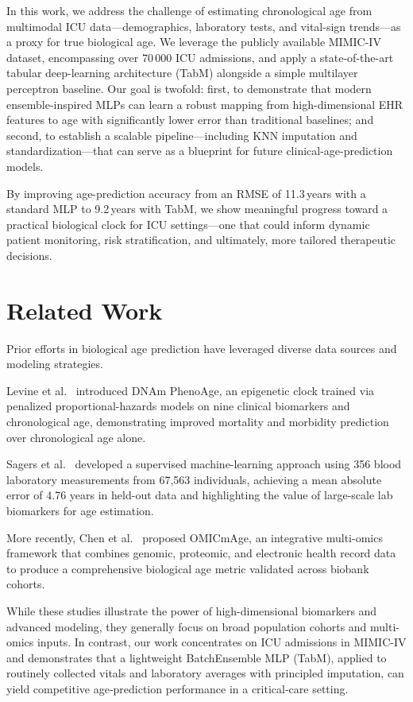 \documentclass[manuscript,screen,review]{acmart}
\begin{document}
In this work, we address the challenge of estimating chronological age from multimodal ICU data—demographics, laboratory tests, and vital-sign trends—as a proxy for true biological age. We leverage the publicly available MIMIC-IV dataset, encompassing over 70\,000 ICU admissions, and apply a state-of-the-art tabular deep-learning architecture (TabM) alongside a simple multilayer perceptron baseline. Our goal is twofold: first, to demonstrate that modern ensemble-inspired MLPs can learn a robust mapping from high-dimensional EHR features to age with significantly lower error than traditional baselines; and second, to establish a scalable pipeline—including KNN imputation and standardization—that can serve as a blueprint for future clinical-age-prediction models.

By improving age-prediction accuracy from an RMSE of 11.3\,years with a standard MLP to 9.2\,years with TabM, we show meaningful progress toward a practical biological clock for ICU settings—one that could inform dynamic patient monitoring, risk stratification, and ultimately, more tailored therapeutic decisions.

\section{Related Work}

Prior efforts in biological age prediction have leveraged diverse data sources and modeling strategies.

Levine et al.~\cite{levine2018epigenetic} introduced DNAm PhenoAge, an epigenetic clock trained via penalized proportional-hazards models on nine clinical biomarkers and chronological age, demonstrating improved mortality and morbidity prediction over chronological age alone.

Sagers et al.~\cite{sagers2020prediction} developed a supervised machine-learning approach using 356 blood laboratory measurements from 67,563 individuals, achieving a mean absolute error of 4.76 years in held-out data and highlighting the value of large-scale lab biomarkers for age estimation.

More recently, Chen et al.~\cite{chen2023omicage} proposed OMICmAge, an integrative multi-omics framework that combines genomic, proteomic, and electronic health record data to produce a comprehensive biological age metric validated across biobank cohorts.

While these studies illustrate the power of high-dimensional biomarkers and advanced modeling, they generally focus on broad population cohorts and multi-omics inputs. In contrast, our work concentrates on ICU admissions in MIMIC-IV and demonstrates that a lightweight BatchEnsemble MLP (TabM), applied to routinely collected vitals and laboratory averages with principled imputation, can yield competitive age‐prediction performance in a critical‐care setting.
\end{document}
